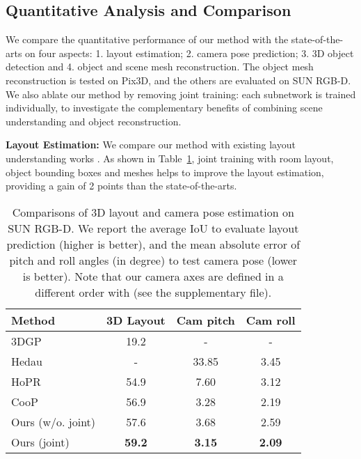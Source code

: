 \documentclass[10pt,twocolumn,letterpaper]{article}
\begin{document}
\subsection{Quantitative Analysis and Comparison}
We compare the quantitative performance of our method with the state-of-the-arts on four aspects: 1. layout estimation; 2. camera pose prediction; 3. 3D object detection and 4. object and scene mesh reconstruction.  The object mesh reconstruction is tested on Pix3D, and the others are evaluated on SUN RGB-D. We also ablate our method by removing joint training: each subnetwork is trained individually, to investigate the complementary benefits of combining scene understanding and object reconstruction.

\noindent \textbf{Layout Estimation:} We compare our method with existing layout understanding works \cite{choi2013understanding,huang2018holistic,huang2018cooperative}. As shown in Table~\ref{compare:layout}, joint training with room layout, object bounding boxes and meshes helps to improve the layout estimation, providing a gain of 2 points than the state-of-the-arts.

\begin{table}
	\begin{center}
		\begin{tabular}{|l|c|c|c|}
			\hline
			Method & 3D Layout & Cam pitch & Cam roll \\
			\hline\hline
			3DGP \cite{choi2013understanding} & 19.2 & - & - \\
			Hedau \cite{hedau2009recovering} & - & 33.85 & 3.45\\
			HoPR \cite{huang2018holistic} & 54.9 & 7.60 & 3.12 \\
			CooP \cite{huang2018cooperative} & 56.9 & 3.28 & 2.19\\
			Ours (w/o. joint) & 57.6 & 3.68 & 2.59 \\
			Ours (joint) & \textbf{59.2} & \textbf{3.15} & \textbf{2.09} \\
			\hline
		\end{tabular}
	\end{center}
	\caption{Comparisons of 3D layout and camera pose estimation on SUN RGB-D. We report the average IoU to evaluate layout prediction (higher is better), and the mean absolute error of pitch and roll angles (in degree) to test camera pose (lower is better). Note that our camera axes are defined in a different order with \cite{huang2018cooperative} (see the supplementary file).}
	\label{compare:layout}
\end{table}
\end{document}
